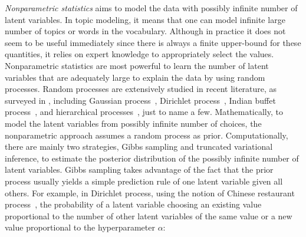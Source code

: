 \emph{Nonparametric statistics} aims to model the data with possibly infinite
number of latent variables. In topic modeling, it means that one can model
infinite large number of topics or words in the vocabulary. Although in practice
it does not seem to be useful immediately since there is always a finite
upper-bound for these quantities, it relies on expert knowledge to appropriately
select the values. Nonparametric statistics are most powerful to learn the
number of latent variables that are adequately large to explain the data by
using random processes. Random processes are extensively studied in recent
literature, as surveyed in \cite{hajek2015random}, including Gaussian
process~\cite{rasmussen2006gaussian}, Dirichlet process~\cite{teh2011dirichlet},
Indian buffet process~\cite{ghahramani2005infinite}, and hierarchical
processes~\cite{teh2012hierarchical,griffiths2004hierarchical,blei2010nested},
just to name a few. Mathematically, to model the latent variables from possibly
infinite number of choices, the nonparametric approach assumes a random process
as prior. Computationally, there are mainly two strategies, Gibbs sampling and
truncated variational inference, to estimate the posterior distribution of the
possibly infinite number of latent variables. Gibbs sampling takes advantage of
the fact that the prior process usually yields a simple prediction rule of one
latent variable given all others. For example, in Dirichlet process, using the
notion of Chinese restaurant process~\cite{pitman2002combinatorial}, the
probability of a latent variable choosing an existing value proportional to the
number of other latent variables of the same value or a new value proportional
to the hyperparameter $\alpha$:

